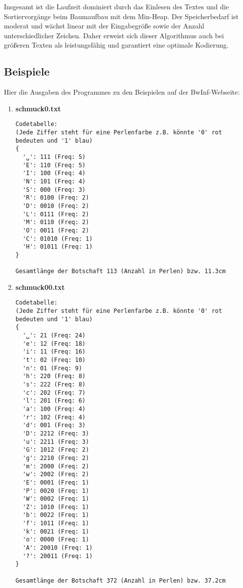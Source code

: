 \documentclass[a4paper,10pt,ngerman]{scrartcl}
\begin{document}
\vspace{1em}
Insgesamt ist die Laufzeit dominiert durch das Einlesen des Textes und die Sortiervorgänge beim Baumaufbau mit dem Min-Heap. Der Speicherbedarf ist moderat und wächst linear mit der Eingabegröße sowie der Anzahl unterschiedlicher Zeichen. 
\newline
Daher erweist sich dieser Algorithmus auch bei größeren Texten als leistungsfähig und garantiert eine optimale Kodierung.


\subsection{Beispiele}

Hier die Ausgaben des Programmes zu den Beispielen auf der BwInf-Webseite:

\begin{enumerate}
  \item \textbf{schmuck0.txt}
\begin{verbatim}
Codetabelle:
(Jede Ziffer steht für eine Perlenfarbe z.B. könnte '0' rot bedeuten und '1' blau)
{
  '␣': 111 (Freq: 5)
  'E': 110 (Freq: 5)
  'I': 100 (Freq: 4)
  'N': 101 (Freq: 4)
  'S': 000 (Freq: 3)
  'R': 0100 (Freq: 2)
  'D': 0010 (Freq: 2)
  'L': 0111 (Freq: 2)
  'M': 0110 (Freq: 2)
  'O': 0011 (Freq: 2)
  'C': 01010 (Freq: 1)
  'H': 01011 (Freq: 1)
}

Gesamtlänge der Botschaft 113 (Anzahl in Perlen) bzw. 11.3cm
\end{verbatim}


\item \textbf{schmuck00.txt}
\begin{verbatim}
Codetabelle:
(Jede Ziffer steht für eine Perlenfarbe z.B. könnte '0' rot bedeuten und '1' blau)
{
  '␣': 21 (Freq: 24)
  'e': 12 (Freq: 18)
  'i': 11 (Freq: 16)
  't': 02 (Freq: 10)
  'n': 01 (Freq: 9)
  'h': 220 (Freq: 8)
  's': 222 (Freq: 8)
  'c': 202 (Freq: 7)
  'l': 201 (Freq: 6)
  'a': 100 (Freq: 4)
  'r': 102 (Freq: 4)
  'd': 001 (Freq: 3)
  'D': 2212 (Freq: 3)
  'u': 2211 (Freq: 3)
  'G': 1012 (Freq: 2)
  'g': 2210 (Freq: 2)
  'm': 2000 (Freq: 2)
  'w': 2002 (Freq: 2)
  'E': 0001 (Freq: 1)
  'P': 0020 (Freq: 1)
  'W': 0002 (Freq: 1)
  'Z': 1010 (Freq: 1)
  'b': 0022 (Freq: 1)
  'f': 1011 (Freq: 1)
  'k': 0021 (Freq: 1)
  'o': 0000 (Freq: 1)
  'A': 20010 (Freq: 1)
  '?': 20011 (Freq: 1)
}

Gesamtlänge der Botschaft 372 (Anzahl in Perlen) bzw. 37.2cm
\end{verbatim}


\end{enumerate}
\end{document}
